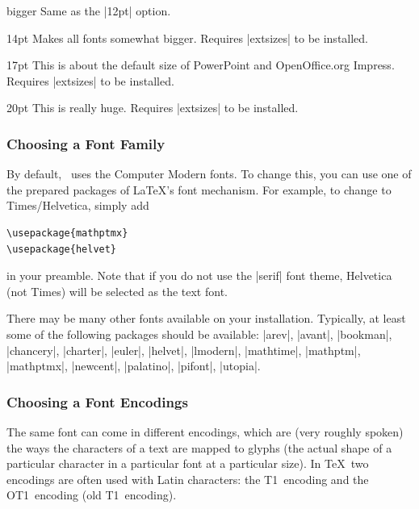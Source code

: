 \begin{classoption}{bigger}
  Same as the |12pt| option.
\end{classoption}

\begin{classoption}{14pt}
  Makes all fonts somewhat bigger. Requires |extsizes| to be installed.
\end{classoption}

\begin{classoption}{17pt}
  This is about the default size of PowerPoint and OpenOffice.org Impress. Requires |extsizes| to be installed.
\end{classoption}

\begin{classoption}{20pt}
  This is really huge. Requires |extsizes| to be installed.
\end{classoption}

\subsubsection{Choosing a Font Family}

\label{section-substition}

By default, \beamer\ uses the Computer Modern fonts. To change this, you can use one of the prepared packages of \LaTeX's font mechanism. For example, to change to Times/Helvetica, simply add
\begin{verbatim}
\usepackage{mathptmx}
\usepackage{helvet}
\end{verbatim}
in your preamble. Note that if you do not use the |serif| font theme, Helvetica (not Times) will be selected as the text font.

There may be many other fonts available on your installation. Typically, at least some of the following packages should be available: |arev|, |avant|, |bookman|, |chancery|, |charter|, |euler|, |helvet|, |lmodern|, |mathtime|, |mathptm|, |mathptmx|, |newcent|, |palatino|, |pifont|, |utopia|.

\subsubsection{Choosing a Font Encodings}
\label{section-font-encoding}

The same font can come in different encodings, which are (very roughly spoken) the ways the characters of a text are mapped to glyphs (the actual shape of a particular character in a particular font at a particular size). In \TeX\ two encodings are often used with Latin characters: the T1~encoding and the OT1~encoding (old T1~encoding).

